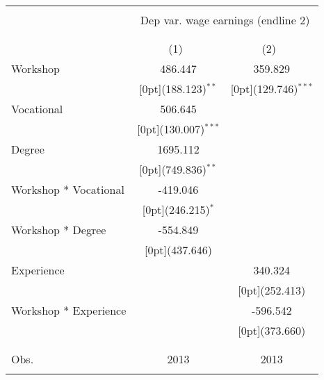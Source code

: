 
\begin{tabular*}{\textwidth}{@{\extracolsep{\fill}}lcc}
\hline
\mbox{} \\ 
& \multicolumn{2}{c}{Dep var. wage earnings (endline 2)} \\
\mbox{} \\ 
\hline
\mbox{} \\ 
& \multicolumn{1}{c}{(1)\mbox{\ }} &        \multicolumn{1}{c}{(2)\mbox{\ }}    \\
\noalign{\smallskip}\hline \noalign{\smallskip}
 Workshop & 486.447 &       359.829    \\
               & \raisebox{.7ex}[0pt]{\scriptsize (188.123)$^{**}$} &  \raisebox{.7ex}[0pt]{\scriptsize (129.746)$^{***}$}     \\
 Vocational & 506.645 &        \\
               & \raisebox{.7ex}[0pt]{\scriptsize (130.007)$^{***}$} &      \\
 Degree & 1695.112 &    \\
               & \raisebox{.7ex}[0pt]{\scriptsize (749.836)$^{**}$} &       \\
 Workshop * Vocational & -419.046 &     \\
               & \raisebox{.7ex}[0pt]{\scriptsize (246.215)$^{*}$} &       \\
 Workshop * Degree & -554.849 &         \\
               & \raisebox{.7ex}[0pt]{\scriptsize (437.646)} &      \\
 Experience &  &    340.324   \\
               &  &   \raisebox{.7ex}[0pt]{\scriptsize (252.413)}   \\
 Workshop * Experience &  &  -596.542  \\
               &  &  \raisebox{.7ex}[0pt]{\scriptsize (373.660)} \\
 \mbox{}\\
 \hline
 \mbox{}\\
  Obs.                 & 2013 &  2013  \\
\mbox{}\\
\hline
\end{tabular*}%